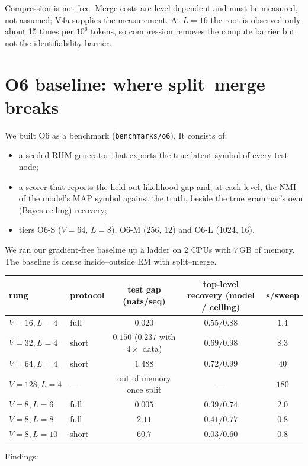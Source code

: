 \documentclass[11pt]{article}
\theoremstyle{definition}
\theoremstyle{remark}
\begin{document}
Compression is not free. Merge costs are level-dependent and must be measured, not assumed; V4a supplies the measurement. At $L=16$ the root is observed only about 15 times per $10^6$ tokens, so compression removes the compute barrier but not the identifiability barrier.

\section{O6 baseline: where split--merge breaks}\label{sec:o6}
We built O6 as a benchmark (\texttt{benchmarks/o6}). It consists of:
\begin{itemize}
  \item a seeded RHM generator that exports the true latent symbol of every test node;
  \item a scorer that reports the held-out likelihood gap and, at each level, the NMI of the model's MAP symbol against the truth, beside the true grammar's own (Bayes-ceiling) recovery;
  \item tiers O6-S ($V{=}64$, $L{=}8$), O6-M ($256$, $12$) and O6-L ($1024$, $16$).
\end{itemize}
We ran our gradient-free baseline up a ladder on 2 CPUs with 7\,GB of memory. The baseline is dense inside--outside EM with split--merge.
\begin{center}\small
\begin{tabular}{llccc}
\toprule
rung & protocol & test gap (nats/seq) & top-level recovery (model / ceiling) & s/sweep\\
\midrule
$V{=}16,L{=}4$ & full & $0.020$ & $0.55/0.88$ & $1.4$\\
$V{=}32,L{=}4$ & short & $0.150$ ($0.237$ with $4\times$ data) & $0.69/0.98$ & $8.3$\\
$V{=}64,L{=}4$ & short & $1.488$ & $0.72/0.99$ & $40$\\
$V{=}128,L{=}4$ & --- & out of memory once split & --- & $180$\\
$V{=}8,L{=}6$ & full & $0.005$ & $0.39/0.74$ & $2.0$\\
$V{=}8,L{=}8$ & full & $2.11$ & $0.41/0.77$ & $0.8$\\
$V{=}8,L{=}10$ & short & $60.7$ & $0.03/0.60$ & $0.8$\\
\bottomrule
\end{tabular}
\end{center}
Findings:
\end{document}
